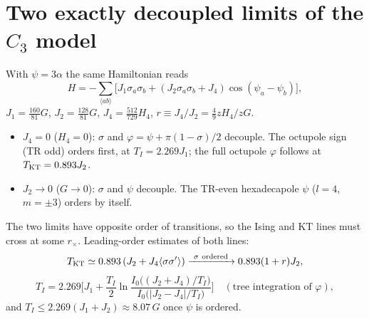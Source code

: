 \documentclass[11pt]{article}
\begin{document}
\section{Two exactly decoupled limits of the $C_3$ model}
With $\psi=3\alpha$ the same Hamiltonian reads
\begin{equation}
H=-\sum_{\langle ab\rangle}\big[J_1\sigma_a\sigma_b+(J_2\sigma_a\sigma_b+J_4)\cos(\psi_a-\psi_b)\big],
\end{equation}
$J_1=\frac{160}{81}G$, $J_2=\frac{128}{81}G$, $J_4=\frac{512}{729}H_4$, $r\equiv J_4/J_2=\frac49 zH_4/zG$.
\begin{itemize}
\item $J_4=0$ ($H_4=0$): $\sigma$ and $\varphi=\psi+\pi(1-\sigma)/2$ decouple. The octupole sign
(TR odd) orders first, at $T_I=2.269J_1$; the full octupole $\varphi$ follows at
$T_{\rm KT}=0.893J_2$.
\item $J_2\to0$ ($G\to0$): $\sigma$ and $\psi$ decouple. The TR-even hexadecapole $\psi$
($l=4$, $m=\pm3$) orders by itself.
\end{itemize}
The two limits have opposite order of transitions, so the Ising and KT lines must cross at
some $r_\times$. Leading-order estimates of both lines:
\begin{equation}
T_{\rm KT}\simeq0.893\,(J_2+J_4\langle\sigma\sigma'\rangle)\xrightarrow{\ \sigma\ \text{ordered}\ }0.893(1+r)J_2,
\end{equation}
\begin{equation}
T_I=2.269\Big[J_1+\frac{T_I}{2}\ln\frac{I_0\big((J_2+J_4)/T_I\big)}{I_0\big(|J_2-J_4|/T_I\big)}\Big]
\quad(\text{tree integration of }\varphi),
\end{equation}
and $T_I\le2.269(J_1+J_2)\approx8.07\,G$ once $\psi$ is ordered.
\end{document}
